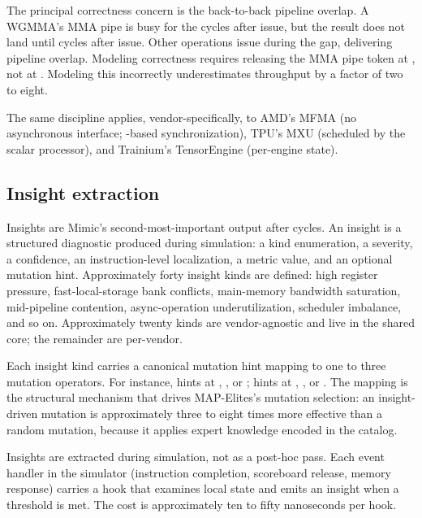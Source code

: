 The principal correctness concern is the back-to-back pipeline overlap.
A WGMMA's MMA pipe is busy for the  cycles after issue, but the result does not land until  cycles after issue.
Other operations issue during the gap, delivering pipeline overlap.
Modeling correctness requires releasing the MMA pipe token at , not at .
Modeling this incorrectly underestimates throughput by a factor of two to eight.

The same discipline applies, vendor-specifically, to AMD's MFMA (no asynchronous interface; -based synchronization), TPU's MXU (scheduled by the scalar processor), and Trainium's TensorEngine (per-engine state).

\subsection{Insight extraction}
\label{sec:mimic-insights}

Insights are Mimic's second-most-important output after cycles.
An insight is a structured diagnostic produced during simulation: a kind enumeration, a severity, a confidence, an instruction-level localization, a metric value, and an optional mutation hint.
Approximately forty insight kinds are defined: high register pressure, fast-local-storage bank conflicts, main-memory bandwidth saturation, mid-pipeline contention, async-operation underutilization, scheduler imbalance, and so on.
Approximately twenty kinds are vendor-agnostic and live in the shared core; the remainder are per-vendor.

Each insight kind carries a canonical mutation hint mapping to one to three mutation operators.
For instance,  hints at , , or ;  hints at , , or .
The mapping is the structural mechanism that drives MAP-Elites's mutation selection: an insight-driven mutation is approximately three to eight times more effective than a random mutation, because it applies expert knowledge encoded in the catalog.

Insights are extracted during simulation, not as a post-hoc pass.
Each event handler in the simulator (instruction completion, scoreboard release, memory response) carries a hook that examines local state and emits an insight when a threshold is met.
The cost is approximately ten to fifty nanoseconds per hook.

